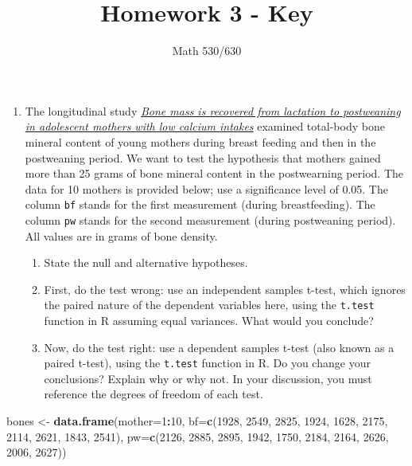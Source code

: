 \documentclass[]{article}
\title{Homework 3 - Key}
\subtitle{Math 530/630}
\author{}
\date{}
\newenvironment{Shaded}{\begin{snugshade}}{\end{snugshade}}
\newcommand{\KeywordTok}[1]{\textcolor[rgb]{0.13,0.29,0.53}{\textbf{#1}}}
\newcommand{\DataTypeTok}[1]{\textcolor[rgb]{0.13,0.29,0.53}{#1}}
\newcommand{\DecValTok}[1]{\textcolor[rgb]{0.00,0.00,0.81}{#1}}
\newcommand{\StringTok}[1]{\textcolor[rgb]{0.31,0.60,0.02}{#1}}
\newcommand{\OperatorTok}[1]{\textcolor[rgb]{0.81,0.36,0.00}{\textbf{#1}}}
\newcommand{\NormalTok}[1]{#1}
\providecommand{\tightlist}{%
  \setlength{\itemsep}{0pt}\setlength{\parskip}{0pt}}
\begin{document}
\maketitle

\begin{enumerate}
\def\labelenumi{\arabic{enumi}.}
\item
  The longitudinal study
  \href{https://www.ncbi.nlm.nih.gov/pubmed/15531682}{\emph{Bone mass is
  recovered from lactation to postweaning in adolescent mothers with low
  calcium intakes}} examined total-body bone mineral content of young
  mothers during breast feeding and then in the postweaning period. We
  want to test the hypothesis that mothers gained more than 25 grams of
  bone mineral content in the postwearning period. The data for 10
  mothers is provided below; use a significance level of 0.05. The
  column \texttt{bf} stands for the first measurement (during
  breastfeeding). The column \texttt{pw} stands for the second
  measurement (during postweaning period). All values are in grams of
  bone density.

  \begin{enumerate}
  \def\labelenumii{\alph{enumii}.}
  \tightlist
  \item
    State the null and alternative hypotheses.
  \item
    First, do the test wrong: use an independent samples t-test, which
    ignores the paired nature of the dependent variables here, using the
    \texttt{t.test} function in R assuming equal variances. What would
    you conclude?
  \item
    Now, do the test right: use a dependent samples t-test (also known
    as a paired t-test), using the \texttt{t.test} function in R. Do you
    change your conclusions? Explain why or why not. In your discussion,
    you must reference the degrees of freedom of each test.
  \end{enumerate}
\end{enumerate}

\begin{Shaded}
\begin{Highlighting}[]
\NormalTok{bones <-}\StringTok{ }\KeywordTok{data.frame}\NormalTok{(}\DataTypeTok{mother=}\DecValTok{1}\OperatorTok{:}\DecValTok{10}\NormalTok{,}
    \DataTypeTok{bf=}\KeywordTok{c}\NormalTok{(}\DecValTok{1928}\NormalTok{, }\DecValTok{2549}\NormalTok{, }\DecValTok{2825}\NormalTok{, }\DecValTok{1924}\NormalTok{, }\DecValTok{1628}\NormalTok{, }\DecValTok{2175}\NormalTok{, }\DecValTok{2114}\NormalTok{, }\DecValTok{2621}\NormalTok{, }\DecValTok{1843}\NormalTok{, }\DecValTok{2541}\NormalTok{),}
    \DataTypeTok{pw=}\KeywordTok{c}\NormalTok{(}\DecValTok{2126}\NormalTok{, }\DecValTok{2885}\NormalTok{, }\DecValTok{2895}\NormalTok{, }\DecValTok{1942}\NormalTok{, }\DecValTok{1750}\NormalTok{, }\DecValTok{2184}\NormalTok{, }\DecValTok{2164}\NormalTok{, }\DecValTok{2626}\NormalTok{, }\DecValTok{2006}\NormalTok{, }\DecValTok{2627}\NormalTok{))}
\end{Highlighting}
\end{Shaded}
\end{document}
